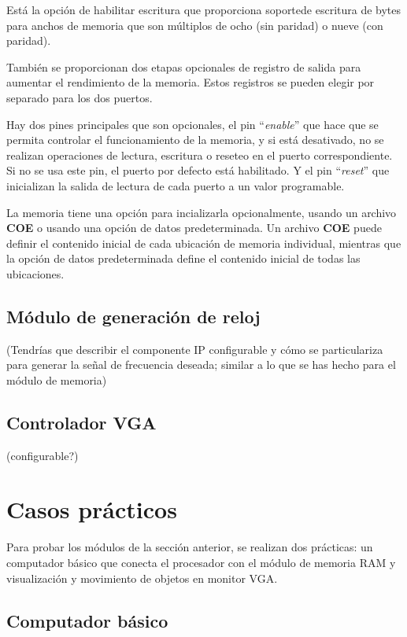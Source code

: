 Está la opción de habilitar escritura que proporciona soportede escritura de bytes para anchos de memoria que 
son múltiplos de ocho (sin paridad) o nueve (con paridad).

También se proporcionan dos etapas opcionales de registro de salida para aumentar el rendimiento de la memoria. 
Estos registros se pueden elegir por separado para los dos puertos. 

Hay dos pines principales que son opcionales, el pin ``\textit{enable}'' que hace que se permita controlar 
el funcionamiento de la memoria, y si está desativado, no se realizan operaciones de lectura, escritura o 
reseteo en el puerto correspondiente. Si no se usa este pin, el puerto por defecto está habilitado. Y el 
pin ``\textit{reset}'' que inicializan la salida de lectura de cada puerto a un valor programable.

La memoria tiene una opción para incializarla opcionalmente, usando un archivo \textbf{COE} o usando una 
opción de datos predeterminada. Un archivo \textbf{COE} puede definir el contenido inicial de cada ubicación 
de memoria individual, mientras que la opción de datos predeterminada define el contenido inicial de todas 
las ubicaciones.

\subsection{Módulo de generación de reloj}

(Tendrías que describir el componente IP configurable y cómo se particulariza para generar la
señal de frecuencia deseada; similar a lo que se has hecho para el módulo de memoria)

\subsection{Controlador VGA}
(configurable?)



\section{Casos prácticos}

Para probar los módulos de la sección anterior, se realizan dos prácticas: un computador básico que conecta el procesador con el
módulo de memoria RAM y visualización y movimiento de objetos en monitor VGA.

\subsection{Computador básico}

